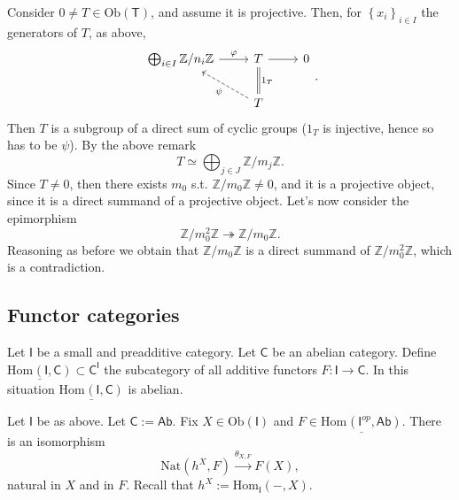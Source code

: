 \begin{ex}
\begin{itemize}
			Consider $0 \neq T \in \mathrm{Ob} \left(\mathsf{T}\right)$,
			and assume it is projective.
			Then, for $\left\{ x_i \right\}_{i \in I}$ the generators of $T$, as above,
			\begin{equation}
			\begin{tikzcd}
				\bigoplus_{i \in I} \mathbb{Z}/n_i\mathbb{Z} \arrow[r, "\varphi", rightarrow] &
				T \arrow[r, "", rightarrow] &
				0 \\
				&
				T \arrow[ul, "\psi", dashrightarrow] \arrow[u, "1_T"', equals] &
			\end{tikzcd}
			.\end{equation} 
			Then $T$ is a subgroup of a direct sum of cyclic groups
			($1_T$ is injective, hence so has to be $\psi$).
			By the above remark
			\begin{equation}
			T \simeq \bigoplus_{j \in J} \mathbb{Z}/m_j\mathbb{Z}
			.\end{equation} 
			Since $T \neq 0$, then there exists $m_0$ s.t.
			$\mathbb{Z}/m_0\mathbb{Z} \neq 0$, and it is a projective object, since
			it is a direct summand of a projective object.
			Let's now consider the epimorphism
			\begin{equation}
			\mathbb{Z}/m_0^2\mathbb{Z} \twoheadrightarrow \mathbb{Z}/m_0\mathbb{Z}
			.\end{equation} 
			Reasoning as before we obtain that $\mathbb{Z}/m_0\mathbb{Z}$ is a direct
			summand of $\mathbb{Z}/m_0^2\mathbb{Z}$, which is a contradiction.
	\end{itemize}
\end{ex} 

\subsection{Functor categories}
\begin{rem}
	Let $\mathsf{I}$ be a small and preadditive category.
	Let $\mathsf{C}$ be an abelian category.
	Define
	$\underline{\mathrm{Hom}_{\mathsf{}} \left( \mathsf{I}, \mathsf{C} \right)} 
	\subset \mathsf{C}^{\mathsf{I}}$
	the subcategory of all additive functors $F: \mathsf{I} \to \mathsf{C}$.
	In this situation 
	$\underline{\mathrm{Hom}_{\mathsf{}} \left( \mathsf{I}, \mathsf{C} \right)}$ is abelian.
\end{rem}

\begin{lem}[Yoneda]
	Let $\mathsf{I}$ be as above.
	Let $\mathsf{C} := \mathsf{Ab}$.
	Fix $X \in \mathrm{Ob} \left(\mathsf{I}\right)$ and
	$F \in \underline{\mathrm{Hom}_{\mathsf{}} \left( \mathsf{I}^{op}, \mathsf{Ab} \right)}$.
	There is an isomorphism
	\begin{equation}
	\mathrm{Nat} \left( h^X, F \right) \xrightarrow{\theta_{X,F}} 
	F(X)
	,\end{equation} 
	natural in $X$ and in $F$.
	Recall that $h^X := \mathrm{Hom}_{\mathsf{I}} \left( -, X \right)$.
\end{lem} 

